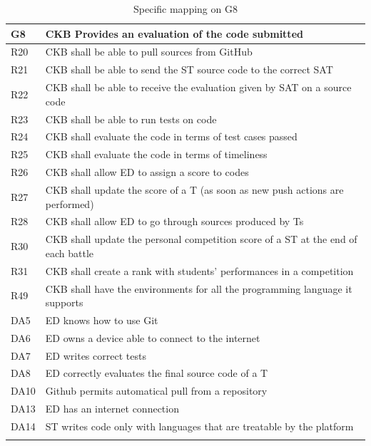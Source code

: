   \begin{longtable}{|l|p{12cm}|}
    \hline
    \textbf{G8} & \textbf{CKB Provides an evaluation of the code submitted}      \\
    \hline
    R20 & CKB shall be able to pull sources from GitHub \\
    \hline
    R21 & CKB shall be able to send the ST source code to the correct SAT \\
    \hline
    R22 & CKB shall be able to receive the evaluation given by SAT on a source code \\
    \hline
    R23 & CKB shall be able to run tests on code \\
    \hline
    R24 & CKB shall evaluate the code in terms of test cases passed \\
    \hline
    R25 & CKB shall evaluate the code in terms of timeliness \\
    \hline
    R26 & CKB shall allow ED to assign a score to codes \\
    \hline
    R27 & CKB shall update the score of a T (as soon as new push actions are performed) \\
    \hline
    R28 & CKB shall allow ED to go through sources produced by Ts \\
    \hline
    R30 & CKB shall update the personal competition score of a ST at the end of each battle \\
    \hline
    R31 & CKB shall create a rank with students' performances in a competition \\
    \hline
    R49 & CKB shall have the environments for all the programming language it supports \\
    \hline
    DA5 & ED knows how to use Git \\
    \hline
    DA6 & ED owns a device able to connect to the internet \\
    \hline
    DA7 & ED writes correct tests \\
    \hline
    DA8 & ED correctly evaluates the final source code of a T \\
    \hline
    DA10 & Github permits automatical pull from a repository \\
    \hline
    DA13 & ED has an internet connection \\
    \hline
    DA14 & ST writes code only with languages that are treatable by the platform \\
    \hline

    \caption{Specific mapping on G8}
    \label{tab:mappingG8}
  \end{longtable}

